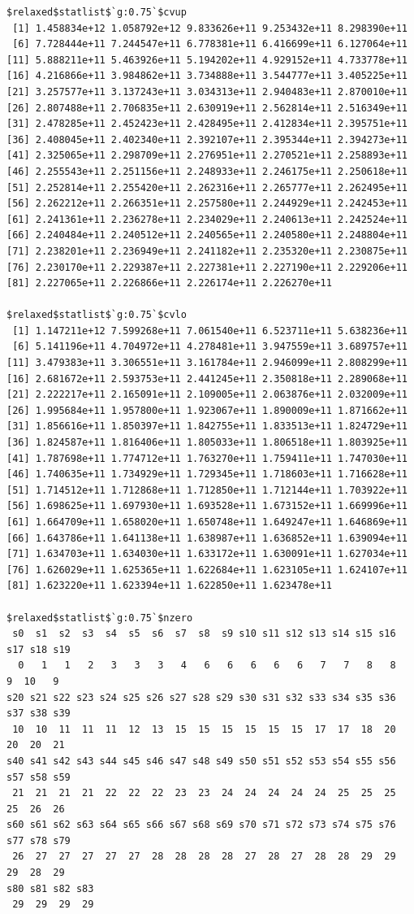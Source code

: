 \documentclass[
]{article}
\begin{document}
\begin{verbatim}
$relaxed$statlist$`g:0.75`$cvup
 [1] 1.458834e+12 1.058792e+12 9.833626e+11 9.253432e+11 8.298390e+11
 [6] 7.728444e+11 7.244547e+11 6.778381e+11 6.416699e+11 6.127064e+11
[11] 5.888211e+11 5.463926e+11 5.194202e+11 4.929152e+11 4.733778e+11
[16] 4.216866e+11 3.984862e+11 3.734888e+11 3.544777e+11 3.405225e+11
[21] 3.257577e+11 3.137243e+11 3.034313e+11 2.940483e+11 2.870010e+11
[26] 2.807488e+11 2.706835e+11 2.630919e+11 2.562814e+11 2.516349e+11
[31] 2.478285e+11 2.452423e+11 2.428495e+11 2.412834e+11 2.395751e+11
[36] 2.408045e+11 2.402340e+11 2.392107e+11 2.395344e+11 2.394273e+11
[41] 2.325065e+11 2.298709e+11 2.276951e+11 2.270521e+11 2.258893e+11
[46] 2.255543e+11 2.251156e+11 2.248933e+11 2.246175e+11 2.250618e+11
[51] 2.252814e+11 2.255420e+11 2.262316e+11 2.265777e+11 2.262495e+11
[56] 2.262212e+11 2.266351e+11 2.257580e+11 2.244929e+11 2.242453e+11
[61] 2.241361e+11 2.236278e+11 2.234029e+11 2.240613e+11 2.242524e+11
[66] 2.240484e+11 2.240512e+11 2.240565e+11 2.240580e+11 2.248804e+11
[71] 2.238201e+11 2.236949e+11 2.241182e+11 2.235320e+11 2.230875e+11
[76] 2.230170e+11 2.229387e+11 2.227381e+11 2.227190e+11 2.229206e+11
[81] 2.227065e+11 2.226866e+11 2.226174e+11 2.226270e+11

$relaxed$statlist$`g:0.75`$cvlo
 [1] 1.147211e+12 7.599268e+11 7.061540e+11 6.523711e+11 5.638236e+11
 [6] 5.141196e+11 4.704972e+11 4.278481e+11 3.947559e+11 3.689757e+11
[11] 3.479383e+11 3.306551e+11 3.161784e+11 2.946099e+11 2.808299e+11
[16] 2.681672e+11 2.593753e+11 2.441245e+11 2.350818e+11 2.289068e+11
[21] 2.222217e+11 2.165091e+11 2.109005e+11 2.063876e+11 2.032009e+11
[26] 1.995684e+11 1.957800e+11 1.923067e+11 1.890009e+11 1.871662e+11
[31] 1.856616e+11 1.850397e+11 1.842755e+11 1.833513e+11 1.824729e+11
[36] 1.824587e+11 1.816406e+11 1.805033e+11 1.806518e+11 1.803925e+11
[41] 1.787698e+11 1.774712e+11 1.763270e+11 1.759411e+11 1.747030e+11
[46] 1.740635e+11 1.734929e+11 1.729345e+11 1.718603e+11 1.716628e+11
[51] 1.714512e+11 1.712868e+11 1.712850e+11 1.712144e+11 1.703922e+11
[56] 1.698625e+11 1.697930e+11 1.693528e+11 1.673152e+11 1.669996e+11
[61] 1.664709e+11 1.658020e+11 1.650748e+11 1.649247e+11 1.646869e+11
[66] 1.643786e+11 1.641138e+11 1.638987e+11 1.636852e+11 1.639094e+11
[71] 1.634703e+11 1.634030e+11 1.633172e+11 1.630091e+11 1.627034e+11
[76] 1.626029e+11 1.625365e+11 1.622684e+11 1.623105e+11 1.624107e+11
[81] 1.623220e+11 1.623394e+11 1.622850e+11 1.623478e+11

$relaxed$statlist$`g:0.75`$nzero
 s0  s1  s2  s3  s4  s5  s6  s7  s8  s9 s10 s11 s12 s13 s14 s15 s16 s17 s18 s19 
  0   1   1   2   3   3   3   4   6   6   6   6   6   7   7   8   8   9  10   9 
s20 s21 s22 s23 s24 s25 s26 s27 s28 s29 s30 s31 s32 s33 s34 s35 s36 s37 s38 s39 
 10  10  11  11  11  12  13  15  15  15  15  15  15  17  17  18  20  20  20  21 
s40 s41 s42 s43 s44 s45 s46 s47 s48 s49 s50 s51 s52 s53 s54 s55 s56 s57 s58 s59 
 21  21  21  21  22  22  22  23  23  24  24  24  24  24  25  25  25  25  26  26 
s60 s61 s62 s63 s64 s65 s66 s67 s68 s69 s70 s71 s72 s73 s74 s75 s76 s77 s78 s79 
 26  27  27  27  27  27  28  28  28  28  27  28  27  28  28  29  29  29  28  29 
s80 s81 s82 s83 
 29  29  29  29 



\end{verbatim}
\end{document}
